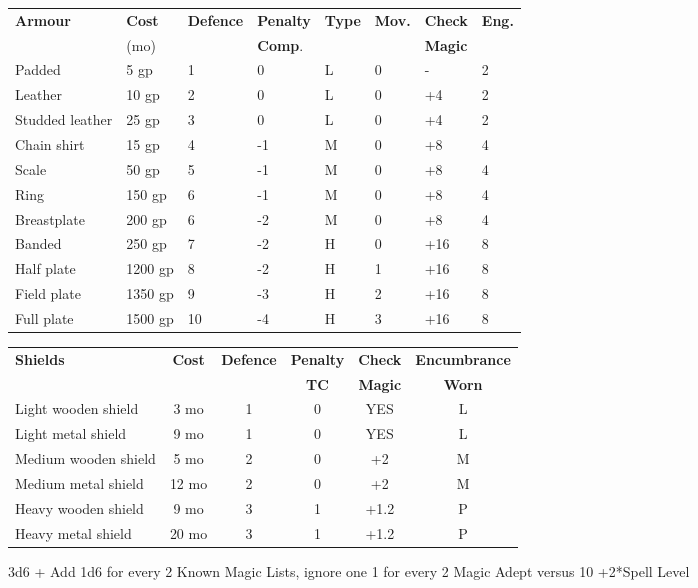 \documentclass[landscape,10pt,a4paper]{article}
\begin{document}
\begin{multicols}{2}
\begin{dmbox}[title=Armour - page \pageref{equipmentarmour}]
\begin{tabular}{llllllll}
\textbf{Armour} & \textbf{Cost} & \textbf{Defence} & \textbf{Penalty} & \textbf{Type} & \textbf{Mov.} & \textbf{Check}&\textbf{Eng.}\\
&(mo)&&\textbf{Comp}.&&&\textbf{Magic}&\\
\hline
Padded 			& 5 gp 		& 1	& 0		& L & 0 & -&2\\
Leather 		& 10 gp 	& 2	& 0 	& L & 0 & +4&2\\
Studded leather	& 25 gp		& 3	& 0 	& L & 0 & +4&2\\
Chain shirt 	& 15 gp 	& 4	& -1 	& M & 0 &+8&4\\
Scale			& 50 gp 	& 5	& -1	& M & 0 &+8&4\\
Ring 			& 150 gp 	& 6	& -1	& M & 0 &+8&4\\
Breastplate		& 200 gp 	& 6	& -2	& M & 0 &+8&4\\
Banded 			& 250 gp 	& 7	& -2	& H & 0 &+16&8\\
Half plate		& 1200 gp	& 8	& -2	& H & 1 &+16&8\\
Field plate		& 1350 gp	& 9	& -3	& H & 2 &+16&8\\
Full plate		& 1500 gp	& 10& -4	& H & 3 &+16&8
\end{tabular}
\end{dmbox}

\begin{dmbox}[title=Shields - page \pageref{shield-table}]
\begin{tabular}{lccccc}
\textbf{Shields} & \textbf{Cost} & \textbf{Defence} & \textbf{Penalty} & \textbf{Check} & \textbf{Encumbrance}\\
&&&\textbf{TC}&\textbf{Magic}&\textbf{Worn}\\
\hline
Light wooden shield & 3 mo & 1& 0& YES & L\\
Light metal shield & 9 mo & 1& 0& YES & L\\
Medium wooden shield &5 mo & 2& 0& +2& M\\
Medium metal shield &12 mo & 2 & 0& +2 & M\\
Heavy wooden shield & 9 mo & 3 & 1& +1.2 & P\\
Heavy metal shield & 20 mo & 3& 1& +1.2 & P\\
\end{tabular}
\end{dmbox}

\begin{dmbox}[title=Magic Check - page \pageref{magieprovadimagia}]
3d6 + Add 1d6 for every 2 Known Magic Lists, ignore one 1 for every 2 Magic Adept versus 10 +2*Spell Level
\end{dmbox}


\end{multicols}
\end{document}
